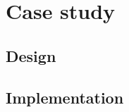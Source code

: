 \section{Case study}\label{sec:case_study}

\subsection{Design}\label{subsec:design}

\subsection{Implementation}\label{subsec:implementation}
